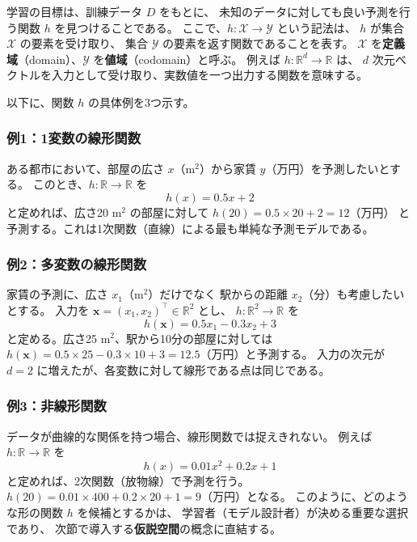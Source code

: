学習の目標は、訓練データ $D$ をもとに、
未知のデータに対しても良い予測を行う関数 $h$ を見つけることである。
ここで、$h : \mathcal{X} \to \mathcal{Y}$ という記法は、
$h$ が集合 $\mathcal{X}$ の要素を受け取り、
集合 $\mathcal{Y}$ の要素を返す関数であることを表す。
$\mathcal{X}$ を\textbf{定義域}（domain）、$\mathcal{Y}$ を\textbf{値域}（codomain）と呼ぶ。
例えば $h : \mathbb{R}^d \to \mathbb{R}$ は、
$d$ 次元ベクトルを入力として受け取り、実数値を一つ出力する関数を意味する。

以下に、関数 $h$ の具体例を3つ示す。

\subsubsection{例1：1変数の線形関数}

ある都市において、部屋の広さ $x$（$\mathrm{m}^2$）から家賃 $y$（万円）を予測したいとする。
このとき、$h : \mathbb{R} \to \mathbb{R}$ を
\begin{equation}
  h(x) = 0.5x + 2
\end{equation}
と定めれば、広さ20 $\mathrm{m}^2$ の部屋に対して $h(20) = 0.5 \times 20 + 2 = 12$（万円）
と予測する。これは1次関数（直線）による最も単純な予測モデルである。

\subsubsection{例2：多変数の線形関数}

家賃の予測に、広さ $x_1$（$\mathrm{m}^2$）だけでなく
駅からの距離 $x_2$（分）も考慮したいとする。
入力を $\bm{x} = (x_1, x_2)^\top \in \mathbb{R}^2$ とし、
$h : \mathbb{R}^2 \to \mathbb{R}$ を
\begin{equation}
  h(\bm{x}) = 0.5 x_1 - 0.3 x_2 + 3
\end{equation}
と定める。広さ25 $\mathrm{m}^2$、駅から10分の部屋に対しては
$h(\bm{x}) = 0.5 \times 25 - 0.3 \times 10 + 3 = 12.5$（万円）と予測する。
入力の次元が $d = 2$ に増えたが、各変数に対して線形である点は同じである。

\subsubsection{例3：非線形関数}

データが曲線的な関係を持つ場合、線形関数では捉えきれない。
例えば $h : \mathbb{R} \to \mathbb{R}$ を
\begin{equation}
  h(x) = 0.01 x^2 + 0.2 x + 1
\end{equation}
と定めれば、2次関数（放物線）で予測を行う。
$h(20) = 0.01 \times 400 + 0.2 \times 20 + 1 = 9$（万円）となる。
このように、どのような形の関数 $h$ を候補とするかは、
学習者（モデル設計者）が決める重要な選択であり、
次節で導入する\textbf{仮説空間}の概念に直結する。


